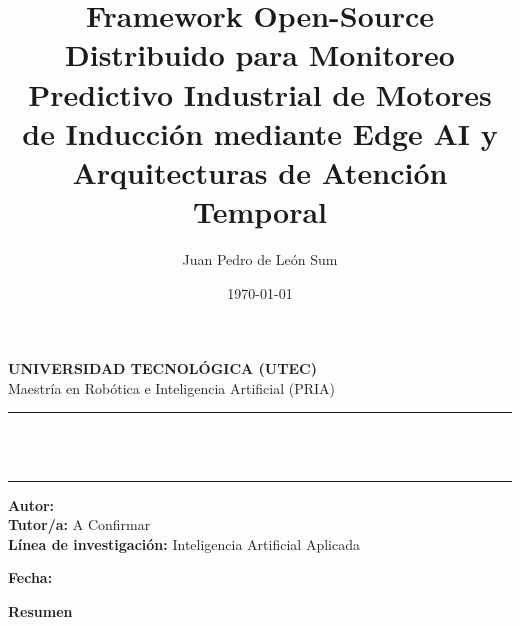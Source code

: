 \documentclass[11pt]{article}
\title{Framework Open-Source Distribuido para Monitoreo Predictivo Industrial de Motores de Inducción mediante Edge AI y Arquitecturas de Atención Temporal}
\author{Juan Pedro de León Sum}
\date{\today}
\makeatletter
\let\thetitle\@title
\let\theauthor\@author
\let\thedate\@date
\makeatother
\begin{document}
\begin{titlepage}
\vspace*{-2 cm}

\begin{center}
{\Large \bfseries UNIVERSIDAD TECNOLÓGICA (UTEC)}\\[0.3cm]
{\large Maestría en Robótica e Inteligencia Artificial (PRIA)}
\end{center}

\vspace{2.5 cm}

\begin{center}
\noindent\rule{12cm}{0.4mm}\\[0.3cm]
{\Huge \bfseries \textcolor{Micolor1}{\thetitle}}\\[0.5cm]
\noindent\rule{12cm}{0.4mm}
\end{center}

\vspace{2 cm}

\begin{center}
\textbf{\large \textcolor{Micolor1}{Autor:}} \large \theauthor\\[0.4cm]
\textbf{\large \textcolor{Micolor1}{Tutor/a:}} \large A Confirmar\\[0.4cm]
\textbf{\large \textcolor{Micolor1}{Línea de investigación:}} \large Inteligencia Artificial Aplicada
\end{center}

\vfill

\begin{center}
\textbf{\small \textcolor{Micolor1}{Fecha:}} \small \thedate
\end{center}

\end{titlepage}


\renewcommand{\thepage}{\roman{page}}

\begin{center}
\normalsize \textbf{Resumen}
\end{center}
\end{document}
